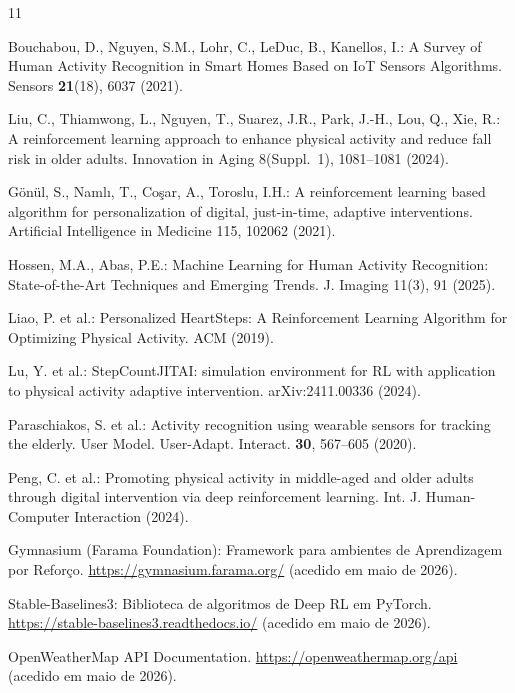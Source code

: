 \documentclass[runningheads]{llncs}
\begin{document}
%
%
% 
% 
%
\begin{thebibliography}{11}

Bouchabou, D., Nguyen, S.M., Lohr, C., LeDuc, B., Kanellos, I.: A Survey of Human Activity Recognition in Smart Homes Based on IoT Sensors Algorithms. Sensors \textbf{21}(18), 6037 (2021).

Liu, C., Thiamwong, L., Nguyen, T., Suarez, J.R., Park, J.-H., Lou, Q., Xie, R.: A reinforcement learning approach to enhance physical activity and reduce fall risk in older adults. Innovation in Aging 8(Suppl.~1), 1081--1081 (2024). 

Gönül, S., Namlı, T., Coşar, A., Toroslu, I.H.: A reinforcement learning based algorithm for personalization of digital, just-in-time, adaptive interventions. Artificial Intelligence in Medicine 115, 102062 (2021). 

Hossen, M.A., Abas, P.E.: Machine Learning for Human Activity Recognition: State-of-the-Art Techniques and Emerging Trends. J. Imaging 11(3), 91 (2025).

Liao, P. et al.: Personalized HeartSteps: A Reinforcement Learning Algorithm for Optimizing Physical Activity. ACM (2019). 

Lu, Y. et al.: StepCountJITAI: simulation environment for RL with application to physical activity adaptive intervention. arXiv:2411.00336 (2024).

Paraschiakos, S. et al.: Activity recognition using wearable sensors for tracking the elderly. User Model. User-Adapt. Interact. \textbf{30}, 567--605 (2020).

Peng, C. et al.: Promoting physical activity in middle-aged and older adults through digital intervention via deep reinforcement learning. Int. J. Human-Computer Interaction (2024). 

Gymnasium (Farama Foundation): Framework para ambientes de Aprendizagem por Reforço. \url{https://gymnasium.farama.org/} (acedido em maio de 2026).

Stable-Baselines3: Biblioteca de algoritmos de Deep RL em PyTorch. \url{https://stable-baselines3.readthedocs.io/} (acedido em maio de 2026).

OpenWeatherMap API Documentation. \url{https://openweathermap.org/api} (acedido em maio de 2026).

\end{thebibliography}
\end{document}
